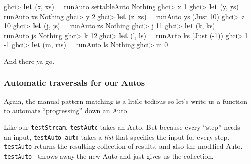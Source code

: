 \documentclass[]{article}
\newenvironment{Shaded}{}{}
\newcommand{\KeywordTok}[1]{\textcolor[rgb]{0.00,0.44,0.13}{\textbf{{#1}}}}
\newcommand{\DataTypeTok}[1]{\textcolor[rgb]{0.56,0.13,0.00}{{#1}}}
\newcommand{\DecValTok}[1]{\textcolor[rgb]{0.25,0.63,0.44}{{#1}}}
\newcommand{\FunctionTok}[1]{\textcolor[rgb]{0.02,0.16,0.49}{{#1}}}
\newcommand{\NormalTok}[1]{{#1}}
\begin{document}
\begin{Shaded}
\begin{Highlighting}[]
\NormalTok{ghci}\FunctionTok{>} \KeywordTok{let} \NormalTok{(x, xs) }\FunctionTok{=} \NormalTok{runAuto settableAuto }\DataTypeTok{Nothing}
\NormalTok{ghci}\FunctionTok{>} \NormalTok{x}
\DecValTok{1}
\NormalTok{ghci}\FunctionTok{>} \KeywordTok{let} \NormalTok{(y, ys) }\FunctionTok{=} \NormalTok{runAuto xs }\DataTypeTok{Nothing}
\NormalTok{ghci}\FunctionTok{>} \NormalTok{y}
\DecValTok{2}
\NormalTok{ghci}\FunctionTok{>} \KeywordTok{let} \NormalTok{(z, zs) }\FunctionTok{=} \NormalTok{runAuto ys (}\DataTypeTok{Just} \DecValTok{10}\NormalTok{)}
\NormalTok{ghci}\FunctionTok{>} \NormalTok{z}
\DecValTok{10}
\NormalTok{ghci}\FunctionTok{>} \KeywordTok{let} \NormalTok{(j, js) }\FunctionTok{=} \NormalTok{runAuto zs }\DataTypeTok{Nothing}
\NormalTok{ghci}\FunctionTok{>} \NormalTok{j}
\DecValTok{11}
\NormalTok{ghci}\FunctionTok{>} \KeywordTok{let} \NormalTok{(k, ks) }\FunctionTok{=} \NormalTok{runAuto js }\DataTypeTok{Nothing}
\NormalTok{ghci}\FunctionTok{>} \NormalTok{k}
\DecValTok{12}
\NormalTok{ghci}\FunctionTok{>} \KeywordTok{let} \NormalTok{(l, ls) }\FunctionTok{=} \NormalTok{runAuto ks (}\DataTypeTok{Just} \NormalTok{(}\FunctionTok{-}\DecValTok{1}\NormalTok{))}
\NormalTok{ghci}\FunctionTok{>} \NormalTok{l}
\FunctionTok{-}\DecValTok{1}
\NormalTok{ghci}\FunctionTok{>} \KeywordTok{let} \NormalTok{(m, ms) }\FunctionTok{=} \NormalTok{runAuto ls }\DataTypeTok{Nothing}
\NormalTok{ghci}\FunctionTok{>} \NormalTok{m}
\DecValTok{0}
\end{Highlighting}
\end{Shaded}

And there ya go.

\subsubsection{Automatic traversals for our
Autos}\label{automatic-traversals-for-our-autos}

Again, the manual pattern matching is a little tedious so let's write us
a function to automate ``progressing'' down an Auto.

Like our \texttt{testStream}, \texttt{testAuto} takes an Auto. But
because every ``step'' needs an input, \texttt{testAuto\ auto} takes a
\emph{list} that specifies the input for every step. \texttt{testAuto}
returns the resulting collection of results, and also the modified Auto.
\texttt{testAuto\_} throws away the new Auto and just gives us the
collection.
\end{document}
